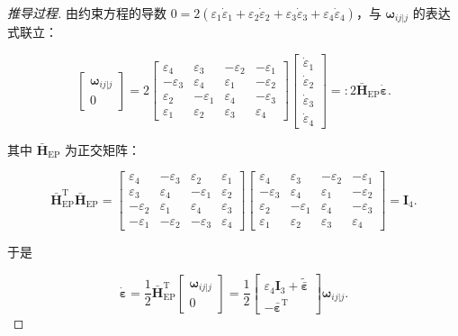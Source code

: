 \begin{proof}[推导过程]
由约束方程的导数 $0=2(\varepsilon_1\dot{\varepsilon}_1+\varepsilon_2\dot{\varepsilon}_2+\varepsilon_3\dot{\varepsilon}_3+\varepsilon_4\dot{\varepsilon}_4)$，与 $\boldsymbol{\omega}_{ij|j}$ 的表达式联立：

\[
\begin{bmatrix}
\boldsymbol{\omega}_{ij|j}\\
0
\end{bmatrix}
=2
\begin{bmatrix}
\varepsilon_4 & \varepsilon_3 & -\varepsilon_2 & -\varepsilon_1\\
-\varepsilon_3 & \varepsilon_4 & \varepsilon_1 & -\varepsilon_2\\
\varepsilon_2 & -\varepsilon_1 & \varepsilon_4 & -\varepsilon_3\\
\varepsilon_1 & \varepsilon_2 & \varepsilon_3 & \varepsilon_4
\end{bmatrix}
\begin{bmatrix}
\dot{\varepsilon}_1\\ \dot{\varepsilon}_2\\ \dot{\varepsilon}_3\\ \dot{\varepsilon}_4
\end{bmatrix}
=:2\bar{\boldsymbol{H}}_{\mathrm{EP}}\dot{\boldsymbol{\varepsilon}}.
\]

其中 $\bar{\boldsymbol{H}}_{\mathrm{EP}}$ 为正交矩阵：

\[
\bar{\boldsymbol{H}}_{\mathrm{EP}}^{\mathrm{T}}\bar{\boldsymbol{H}}_{\mathrm{EP}}
=
\begin{bmatrix}
\varepsilon_4 & -\varepsilon_3 & \varepsilon_2 & \varepsilon_1\\
\varepsilon_3 & \varepsilon_4 & -\varepsilon_1 & \varepsilon_2\\
-\varepsilon_2 & \varepsilon_1 & \varepsilon_4 & \varepsilon_3\\
-\varepsilon_1 & -\varepsilon_2 & -\varepsilon_3 & \varepsilon_4
\end{bmatrix}
\begin{bmatrix}
\varepsilon_4 & \varepsilon_3 & -\varepsilon_2 & -\varepsilon_1\\
-\varepsilon_3 & \varepsilon_4 & \varepsilon_1 & -\varepsilon_2\\
\varepsilon_2 & -\varepsilon_1 & \varepsilon_4 & -\varepsilon_3\\
\varepsilon_1 & \varepsilon_2 & \varepsilon_3 & \varepsilon_4
\end{bmatrix}
=\boldsymbol{I}_4.
\]

于是

\[
\dot{\boldsymbol{\varepsilon}}
=\frac{1}{2}\bar{\boldsymbol{H}}_{\mathrm{EP}}^{\mathrm{T}}
\begin{bmatrix}
\boldsymbol{\omega}_{ij|j}\\ 0
\end{bmatrix}
=\frac{1}{2}
\begin{bmatrix}
\varepsilon_4\boldsymbol{I}_3+\tilde{\bar{\boldsymbol{\varepsilon}}}\\
-\bar{\boldsymbol{\varepsilon}}^{\mathrm{T}}
\end{bmatrix}
\boldsymbol{\omega}_{ij|j}.
\]
\end{proof}
